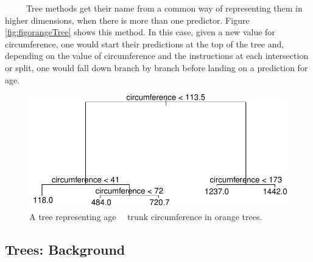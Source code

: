 \documentclass[12pt,twoside]{reedthesis}
\begin{document}
  ~~~~~Tree methods get their name from a common way of representing them
  in higher dimensions, when there is more than one predictor. Figure
  \ref{fig:figorangeTree} shows this method. In this case, given a new
  value for circumference, one would start their predictions at the top of
  the tree and, depending on the value of circumference and the
  instructions at each intersection or split, one would fall down branch
  by branch before landing on a prediction for age.
  
  \begin{figure}[H]
  
  {\centering \includegraphics{Thesis_files/figure-latex/unnamed-chunk-6-1} 
  
  }
  
  \caption{\label{fig:figorangeTree}A tree representing age \ \ trunk circumference in orange trees.}\label{fig:unnamed-chunk-6}
  \end{figure}
  
  \subsection{Trees: Background}\label{trees-background}
  
\end{document}
